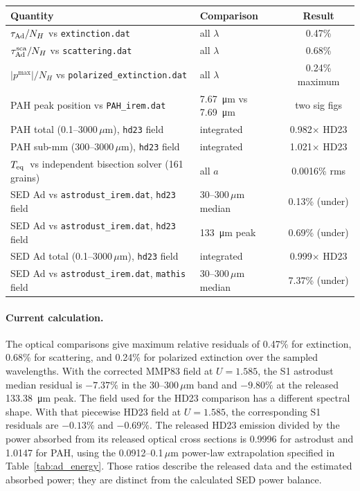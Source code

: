 \documentclass{my_memo}
\newcommand{\Teq}{\ensuremath{T_{\rm eq}}}
\begin{document}
\begin{tabularx}{0.95\textwidth}{l l c}
\toprule
Quantity & Comparison & Result \\
\midrule
$\tau_{\rm Ad}/N_H$ vs \texttt{extinction.dat}       & all $\lambda$         & 0.47\% \\
$\tau^{\rm sca}_{\rm Ad}/N_H$ vs \texttt{scattering.dat} & all $\lambda$    & 0.68\% \\
$|p^{\max}|/N_H$ vs \texttt{polarized\_extinction.dat}   & all $\lambda$    & 0.24\% maximum \\
PAH peak position vs \texttt{PAH\_irem.dat}              & \SI{7.67}{\micro\meter} vs \SI{7.69}{\micro\meter}    & two sig figs \\
PAH total (0.1--3000\,$\mu$m), \texttt{hd23} field     & integrated            & 0.982$\times$ HD23 \\
PAH sub-mm (300--3000\,$\mu$m), \texttt{hd23} field    & integrated            & 1.021$\times$ HD23 \\
\Teq\ vs independent bisection solver (161 grains)       & all $a$               & 0.0016\% rms \\
SED Ad vs \texttt{astrodust\_irem.dat}, \texttt{hd23} field & 30--300\,$\mu$m median & 0.13\% (under) \\
SED Ad vs \texttt{astrodust\_irem.dat}, \texttt{hd23} field & \SI{133}{\micro\meter} peak & 0.69\% (under) \\
SED Ad total (0.1--3000\,$\mu$m), \texttt{hd23} field   & integrated            & 0.999$\times$ HD23 \\
SED Ad vs \texttt{astrodust\_irem.dat}, \texttt{mathis} field & 30--300\,$\mu$m median & 7.37\% (under) \\
\bottomrule
\end{tabularx}

\paragraph{Current calculation.}
The optical comparisons give maximum relative residuals of 0.47\%
for extinction, 0.68\% for scattering, and 0.24\% for polarized
extinction over the sampled wavelengths. With the corrected MMP83
field at $U=1.585$, the S1 astrodust median residual is $-7.37\%$
in the 30--300\,$\mu$m band and $-9.80\%$ at the released
\SI{133.38}{\micro\meter} peak. The field used for the HD23
comparison has a different spectral shape. With that piecewise HD23
field at $U=1.585$, the corresponding S1 residuals are $-0.13\%$
and $-0.69\%$. The released HD23 emission divided by the power
absorbed from its released optical cross sections is 0.9996 for
astrodust and 1.0147 for PAH, using the 0.0912--0.1\,$\mu$m
power-law extrapolation specified in Table~\ref{tab:ad_energy}.
Those ratios describe the released data and the estimated absorbed
power; they are distinct from the calculated SED power balance.
\end{document}

